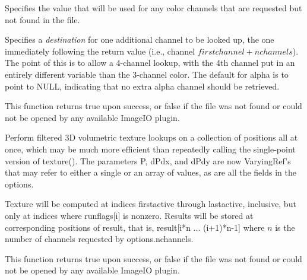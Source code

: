 \vspace{-24pt}
\vspace{10pt}
Specifies the value that will be used for any color channels that are
requested but not found in the file.
\apiend

\vspace{-24pt}
\vspace{10pt}
Specifies a \emph{destination} for one additional channel to be looked
up, the one immediately following the return value (i.e., channel
$\mathit{firstchannel}+\mathit{nchannels}$).  The point of this is to
allow a 4-channel lookup, with the 4th channel put in an entirely
different variable than the 3-channel color.  The default for {\cf
  alpha} is to point to NULL, indicating that no extra alpha channel
should be retrieved.
\apiend

This function returns {\cf true} upon success, or {\cf false} if the
file was not found or could not be opened by any available ImageIO
plugin.

\apiend


Perform filtered 3D volumetric texture lookups on a collection of positions all at
once, which may be much more efficient than repeatedly calling the
single-point version of {\cf texture()}.  The parameters {\cf P},
{\cf dPdx}, and {\cf dPdy} are now
{\cf VaryingRef}'s that may refer to either a single or an array of
values, as are all the fields in the {\cf options}.

Texture will be computed at indices {\cf firstactive} through
{\cf lastactive}, inclusive, but only at indices where {\cf runflags[i]}
is nonzero.  Results will be stored at corresponding positions of
{\cf result}, that is, {\cf result[i*n ... (i+1)*n-1]} where $n$ 
is the number of channels requested by {\cf options.nchannels}.

This function returns {\cf true} upon success, or {\cf false} if the
file was not found or could not be opened by any available ImageIO
plugin.
\apiend

